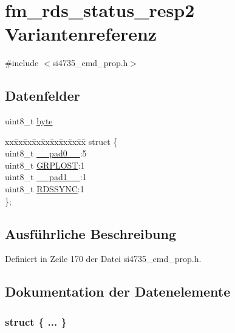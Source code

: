 \hypertarget{unionfm__rds__status__resp2}{}\section{fm\+\_\+rds\+\_\+status\+\_\+resp2 Variantenreferenz}
\label{unionfm__rds__status__resp2}


{\ttfamily \#include $<$si4735\+\_\+cmd\+\_\+prop.\+h$>$}

\subsection*{Datenfelder}
\begin{DoxyCompactItemize}
\item 
uint8\+\_\+t \hyperlink{unionfm__rds__status__resp2_a96f44d20f1dbf1c8785a7bc99a46164c}{byte}
\item 
\begin{tabbing}
xx\=xx\=xx\=xx\=xx\=xx\=xx\=xx\=xx\=\kill
struct \{\\
\>uint8\_t \hyperlink{unionfm__rds__status__resp2_a8b4eebe79ded0459acec2f4950102ba3}{\_\_pad0\_\_}:5\\
\>uint8\_t \hyperlink{unionfm__rds__status__resp2_a430b332cff3a3786c4854defcd95d078}{GRPLOST}:1\\
\>uint8\_t \hyperlink{unionfm__rds__status__resp2_a77f12d2e278bd5c07712648ac0df5e08}{\_\_pad1\_\_}:1\\
\>uint8\_t \hyperlink{unionfm__rds__status__resp2_acdf4253982980384be3340fd9a9ab7c5}{RDSSYNC}:1\\
\}; \\

\end{tabbing}\end{DoxyCompactItemize}


\subsection{Ausführliche Beschreibung}


Definiert in Zeile 170 der Datei si4735\+\_\+cmd\+\_\+prop.\+h.



\subsection{Dokumentation der Datenelemente}
\hypertarget{unionfm__rds__status__resp2_abc25a9b08a96970edd62c0494cdbda74}{}\subsubsection[{"@25}]{\setlength{\rightskip}{0pt plus 5cm}struct \{ ... \} }\label{unionfm__rds__status__resp2_abc25a9b08a96970edd62c0494cdbda74}
\hypertarget{unionfm__rds__status__resp2_a8b4eebe79ded0459acec2f4950102ba3}{}
